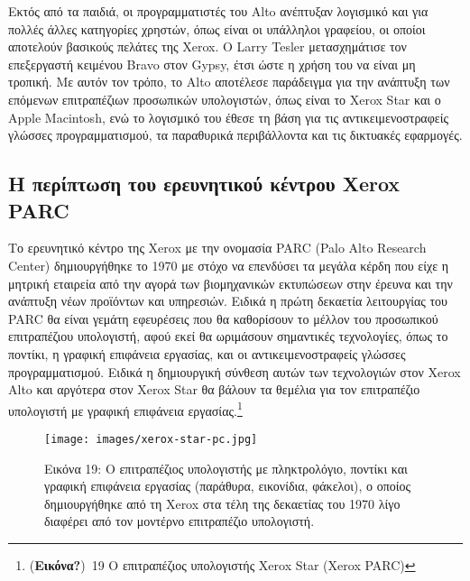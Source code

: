 \documentclass[
]{article}
\begin{document}
Εκτός από τα παιδιά, οι προγραμματιστές του Alto ανέπτυξαν λογισμικό και
για πολλές άλλες κατηγορίες χρηστών, όπως είναι οι υπάλληλοι γραφείου,
οι οποίοι αποτελούν βασικούς πελάτες της Xerox. Ο Larry Tesler
μετασχημάτισε τον επεξεργαστή κειμένου Bravo στον Gypsy, έτσι ώστε η
χρήση του να είναι μη τροπική. Με αυτόν τον τρόπο, το Alto αποτέλεσε
παράδειγμα για την ανάπτυξη των επόμενων επιτραπέζιων προσωπικών
υπολογιστών, όπως είναι το Xerox Star και ο Apple Macintosh, ενώ το
λογισμικό του έθεσε τη βάση για τις αντικειμενοστραφείς γλώσσες
προγραμματισμού, τα παραθυρικά περιβάλλοντα και τις δικτυακές εφαρμογές.

\hypertarget{ux3b7-ux3c0ux3b5ux3c1ux3afux3c0ux3c4ux3c9ux3c3ux3b7-ux3c4ux3bfux3c5-ux3b5ux3c1ux3b5ux3c5ux3bdux3b7ux3c4ux3b9ux3baux3bfux3cd-ux3baux3adux3bdux3c4ux3c1ux3bfux3c5-xerox-parc}{%
\subsection{Η περίπτωση του ερευνητικού κέντρου Xerox
PARC}\label{ux3b7-ux3c0ux3b5ux3c1ux3afux3c0ux3c4ux3c9ux3c3ux3b7-ux3c4ux3bfux3c5-ux3b5ux3c1ux3b5ux3c5ux3bdux3b7ux3c4ux3b9ux3baux3bfux3cd-ux3baux3adux3bdux3c4ux3c1ux3bfux3c5-xerox-parc}}

Το ερευνητικό κέντρο της Xerox με την ονομασία PARC (Palo Alto Research
Center) δημιουργήθηκε το 1970 με στόχο να επενδύσει τα μεγάλα κέρδη που
είχε η μητρική εταιρεία από την αγορά των βιομηχανικών εκτυπώσεων στην
έρευνα και την ανάπτυξη νέων προϊόντων και υπηρεσιών. Ειδικά η πρώτη
δεκαετία λειτουργίας του PARC θα είναι γεμάτη εφευρέσεις που θα
καθορίσουν το μέλλον του προσωπικού επιτραπέζιου υπολογιστή, αφού εκεί
θα ωριμάσουν σημαντικές τεχνολογίες, όπως το ποντίκι, η γραφική
επιφάνεια εργασίας, και οι αντικειμενοστραφείς γλώσσες προγραμματισμού.
Ειδικά η δημιουργική σύνθεση αυτών των τεχνολογιών στον Xerox Alto και
αργότερα στον Xerox Star θα βάλουν τα θεμέλια για τον επιτραπέζιο
υπολογιστή με γραφική επιφάνεια εργασίας.\footnote{(\textbf{Εικόνα?})~19
  Ο επιτραπέζιος υπολογιστής Xerox Star (Xerox PARC)}

\leavevmode{}%
\begin{figure}
\hypertarget{fig:xerox-star-pc}{%
\centering
\texttt{[image: images/xerox-star-pc.jpg]}
\caption{Εικόνα 19: Ο επιτραπέζιος υπολογιστής με πληκτρολόγιο, ποντίκι
και γραφική επιφάνεια εργασίας (παράθυρα, εικονίδια, φάκελοι), ο οποίος
δημιουργήθηκε από τη Xerox στα τέλη της δεκαετίας του 1970 λίγο διαφέρει
από τον μοντέρνο επιτραπέζιο υπολογιστή.}\label{fig:xerox-star-pc}
}
\end{figure}
\end{document}
